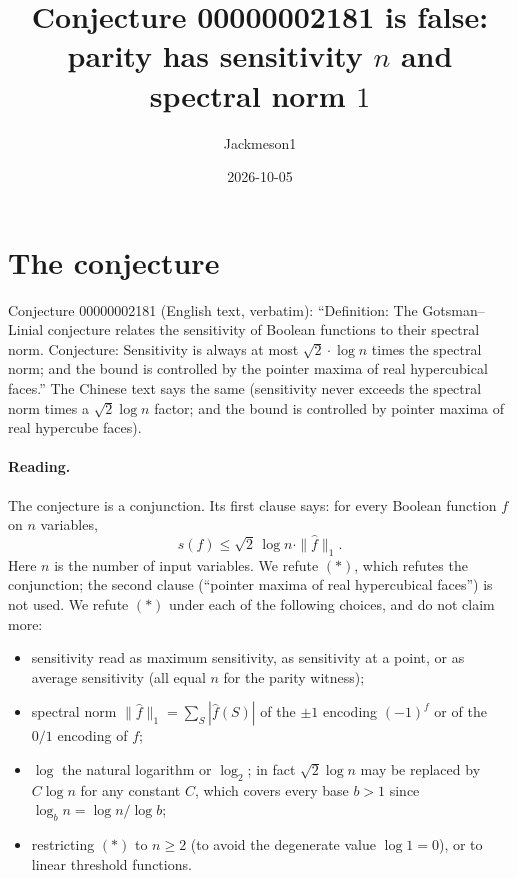 \documentclass[11pt]{article}
\title{Conjecture 00000002181 is false:\\ parity has sensitivity $n$ and spectral norm $1$}
\author{Jackmeson1}
\date{2026-10-05}
\theoremstyle{definition}
\begin{document}
\maketitle

\section{The conjecture}
Conjecture 00000002181 (English text, verbatim): ``Definition: The Gotsman--Linial conjecture
relates the sensitivity of Boolean functions to their spectral norm. Conjecture: Sensitivity is
always at most $\sqrt{2}\cdot\log n$ times the spectral norm; and the bound is controlled by the
pointer maxima of real hypercubical faces.'' The Chinese text says the same (sensitivity never
exceeds the spectral norm times a $\sqrt{2}\log n$ factor; and the bound is controlled by pointer
maxima of real hypercube faces).

\paragraph{Reading.} The conjecture is a conjunction. Its first clause says: for every Boolean
function $f$ on $n$ variables,
\[ s(f) \le \sqrt{2}\,\log n\cdot \|\hat f\|_1 . \tag{$\ast$} \]
Here $n$ is the number of input variables. We refute $(\ast)$, which refutes the conjunction; the
second clause (``pointer maxima of real hypercubical faces'') is not used. We refute $(\ast)$
under each of the following choices, and do not claim more:
\begin{itemize}
\item sensitivity read as maximum sensitivity, as sensitivity at a point, or as average
  sensitivity (all equal $n$ for the parity witness);
\item spectral norm $\|\hat f\|_1=\sum_S|\hat f(S)|$ of the $\pm1$ encoding $(-1)^{f}$ or of the
  $0/1$ encoding of $f$;
\item $\log$ the natural logarithm or $\log_2$; in fact $\sqrt2\log n$ may be replaced by
  $C\log n$ for any constant $C$, which covers every base $b>1$ since $\log_b n=\log n/\log b$;
\item restricting $(\ast)$ to $n\ge 2$ (to avoid the degenerate value $\log 1=0$), or to linear
  threshold functions.
\end{itemize}
\end{document}
